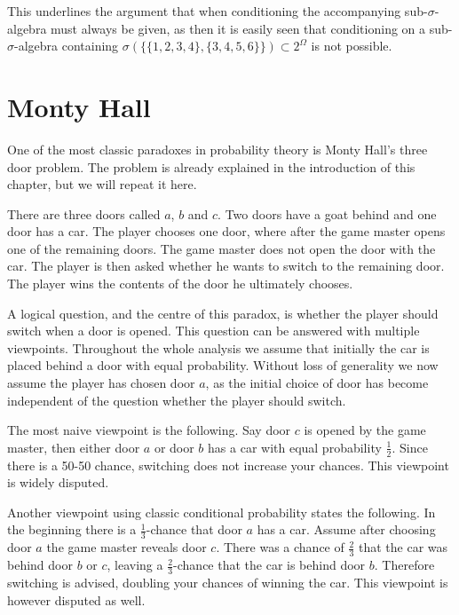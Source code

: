 \documentclass[a4paper]{report}
\theoremstyle{plain}
\theoremstyle{definition}
\theoremstyle{remark}
\numberwithin{equation}{chapter}
\DeclareMathOperator{\1}{\mathbbm{1}}
\begin{document}
This underlines the argument that when conditioning the accompanying sub-$\sigma$-algebra must always be given, as then it is easily seen that conditioning on a sub-$\sigma$-algebra containing $\sigma(\{\{1,2,3,4\},\{3,4,5,6\}\})\subset2^\Omega$ is not possible.

\section{Monty Hall}\label{sec:DiscMonty}
One of the most classic paradoxes in probability theory is Monty Hall's three door problem. The problem is already explained in the introduction of this chapter, but we will repeat it here.

There are three doors called $a$, $b$ and $c$.  Two doors have a goat behind and one door has a car. The player chooses one door, where after the game master opens one of the remaining doors. The game master does not open the door with the car. The player is then asked whether he wants to switch to the remaining door. The player wins the contents of the door he ultimately chooses.

A logical question, and the centre of this paradox, is whether the player should switch when a door is opened. This question can be answered with multiple viewpoints. Throughout the whole analysis we assume that initially the car is placed behind a door with equal probability. Without loss of generality we now assume the player has chosen door $a$, as the initial choice of door has become independent of the question whether the player should switch.

The most naive viewpoint is the following. Say door $c$ is opened by the game master, then either door $a$ or door $b$ has a car with equal probability $\frac{1}{2}$. Since there is a 50-50 chance, switching does not increase your chances. This viewpoint is widely disputed.

Another viewpoint using classic conditional probability states the following. In the beginning there is a $\frac{1}{3}$-chance that door $a$ has a car. Assume after choosing door $a$ the game master reveals door $c$. There was a chance of $\frac{2}{3}$ that the car was behind door $b$ or $c$, leaving a $\frac{2}{3}$-chance that the car is behind door $b$. Therefore switching is advised, doubling your chances of winning the car. This viewpoint is however disputed as well.
\end{document}
